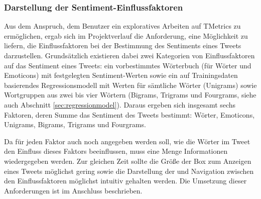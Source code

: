 \subsubsection{Darstellung der Sentiment-Einflussfaktoren}
\label{sec:showTweetsSenti}
Aus dem Anspruch, dem Benutzer ein exploratives Arbeiten auf TMetrics zu ermöglichen, ergab sich im Projektverlauf die Anforderung, eine Möglichkeit zu liefern, die Einflussfaktoren bei der Bestimmung des Sentiments eines Tweets darzustellen. Grundsätzlich existieren dabei zwei Kategorien von Einflussfaktoren auf das Sentiment eines Tweets: ein vorbestimmtes Wörterbuch (für Wörter und Emoticons) mit festgelegten Sentiment-Werten sowie ein auf Trainingsdaten basierendes Regressionsmodell mit Werten für sämtliche Wörter (Unigrams) sowie Wortgruppen aus zwei bis vier Wörtern (Bigrams, Trigrams und Fourgrams, siehe auch Abschnitt \ref{sec:regressionmodel}).  Daraus ergeben sich insgesamt sechs Faktoren, deren Summe das Sentiment des Tweets bestimmt: Wörter, Emoticons, Unigrams, Bigrams, Trigrams und Fourgrams.

Da für jeden Faktor auch noch angegeben werden soll, wie die Wörter im Tweet den Einfluss dieses Faktors beeinflussen, muss eine Menge Informationen wiedergegeben werden. Zur gleichen Zeit sollte die Größe der Box zum Anzeigen eines Tweets möglichst gering sowie die Darstellung der und Navigation zwischen den Einflussfaktoren möglichst intuitiv gehalten werden. Die Umsetzung dieser Anforderungen ist im Anschluss beschrieben.

